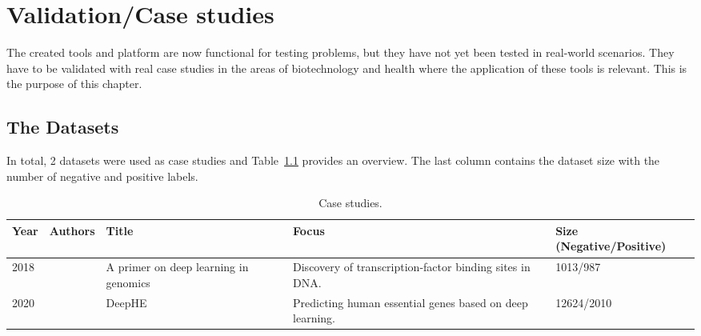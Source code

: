 \chapter{Validation/Case studies}\label{chap:validation}

The created tools and platform are now functional for testing problems, but they have not yet been tested in real-world scenarios. They have to be validated with real case studies in the areas of biotechnology and health where the application of these tools is relevant. This is the purpose of this chapter.

\section{The Datasets}\label{sec:datasets}

In total, 2 datasets were used as case studies and Table~\ref{tab:case_studies} provides an overview. The last column contains the dataset size with the number of negative and positive labels.

\begin{table}[ht]
	\caption{Case studies.}
	\label{tab:case_studies}
    \centering
    \begin{tabular}{lp{2cm}p{3.5cm}p{3.4cm}l}
    	\toprule
    	\textbf{Year} & \textbf{Authors} & \textbf{Title} & \textbf{Focus} & \textbf{Size (Negative/Positive)}\\\midrule
    	
    	
        2018 & \citeauthor{Zou2018AGenomics} & A primer on deep learning in genomics~\cite{Zou2018AGenomics} & Discovery of transcription-factor binding sites in \gls{DNA}. & 1013/987\\\midrule
        
        2020 & \citeauthor{Zhang2020DeepHE:Learning} & DeepHE~\cite{Zhang2020DeepHE:Learning} & Predicting human essential genes based on deep learning. & 12624/2010\\
        
    	\bottomrule
    \end{tabular}
\end{table}


